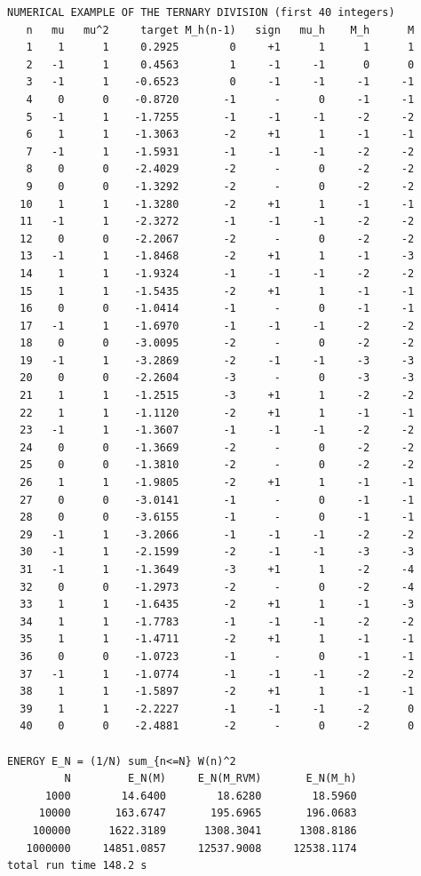 \documentclass[11pt,reqno]{amsart}
\numberwithin{equation}{section}
\theoremstyle{plain}
\theoremstyle{definition}
\theoremstyle{remark}
\begin{document}
\begin{lstlisting}[style=out]
NUMERICAL EXAMPLE OF THE TERNARY DIVISION (first 40 integers)
   n   mu   mu^2     target M_h(n-1)   sign   mu_h    M_h      M
   1    1      1     0.2925        0     +1      1      1      1
   2   -1      1     0.4563        1     -1     -1      0      0
   3   -1      1    -0.6523        0     -1     -1     -1     -1
   4    0      0    -0.8720       -1      -      0     -1     -1
   5   -1      1    -1.7255       -1     -1     -1     -2     -2
   6    1      1    -1.3063       -2     +1      1     -1     -1
   7   -1      1    -1.5931       -1     -1     -1     -2     -2
   8    0      0    -2.4029       -2      -      0     -2     -2
   9    0      0    -1.3292       -2      -      0     -2     -2
  10    1      1    -1.3280       -2     +1      1     -1     -1
  11   -1      1    -2.3272       -1     -1     -1     -2     -2
  12    0      0    -2.2067       -2      -      0     -2     -2
  13   -1      1    -1.8468       -2     +1      1     -1     -3
  14    1      1    -1.9324       -1     -1     -1     -2     -2
  15    1      1    -1.5435       -2     +1      1     -1     -1
  16    0      0    -1.0414       -1      -      0     -1     -1
  17   -1      1    -1.6970       -1     -1     -1     -2     -2
  18    0      0    -3.0095       -2      -      0     -2     -2
  19   -1      1    -3.2869       -2     -1     -1     -3     -3
  20    0      0    -2.2604       -3      -      0     -3     -3
  21    1      1    -1.2515       -3     +1      1     -2     -2
  22    1      1    -1.1120       -2     +1      1     -1     -1
  23   -1      1    -1.3607       -1     -1     -1     -2     -2
  24    0      0    -1.3669       -2      -      0     -2     -2
  25    0      0    -1.3810       -2      -      0     -2     -2
  26    1      1    -1.9805       -2     +1      1     -1     -1
  27    0      0    -3.0141       -1      -      0     -1     -1
  28    0      0    -3.6155       -1      -      0     -1     -1
  29   -1      1    -3.2066       -1     -1     -1     -2     -2
  30   -1      1    -2.1599       -2     -1     -1     -3     -3
  31   -1      1    -1.3649       -3     +1      1     -2     -4
  32    0      0    -1.2973       -2      -      0     -2     -4
  33    1      1    -1.6435       -2     +1      1     -1     -3
  34    1      1    -1.7783       -1     -1     -1     -2     -2
  35    1      1    -1.4711       -2     +1      1     -1     -1
  36    0      0    -1.0723       -1      -      0     -1     -1
  37   -1      1    -1.0774       -1     -1     -1     -2     -2
  38    1      1    -1.5897       -2     +1      1     -1     -1
  39    1      1    -2.2227       -1     -1     -1     -2      0
  40    0      0    -2.4881       -2      -      0     -2      0

ENERGY E_N = (1/N) sum_{n<=N} W(n)^2
         N         E_N(M)     E_N(M_RVM)       E_N(M_h)
      1000        14.6400        18.6280        18.5960
     10000       163.6747       195.6965       196.0683
    100000      1622.3189      1308.3041      1308.8186
   1000000     14851.0857     12537.9008     12538.1174
total run time 148.2 s
\end{lstlisting}
\end{document}
